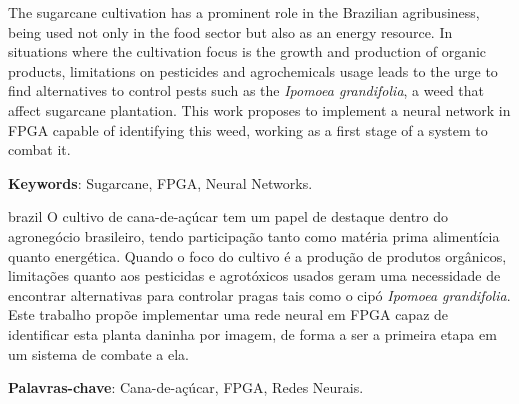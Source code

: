 \documentclass[
    12pt,                       %
    oneside,                    %
    a4paper,                    %
    brazil,                     %
    french,                     %
    spanish,                    %
    english,                    %
    ]{abntex2}
\begin{document}

\frenchspacing


\imprimircapa

\imprimirfolhaderosto



\begin{resumo}
  The sugarcane cultivation has a prominent role in the Brazilian agribusiness, being used not only in the food sector but also as an energy resource. In situations where the cultivation focus is the growth and production of organic products, limitations on pesticides and agrochemicals usage leads to the urge to find alternatives to control pests such as the \textit{Ipomoea grandifolia}, a weed that affect sugarcane plantation. This work proposes to implement a neural network in FPGA capable of identifying this weed, working as a first stage of a system to combat it.

   \vspace{\onelineskip}
   \noindent
   \textbf{Keywords}: Sugarcane, FPGA, Neural Networks.
\end{resumo}

\setlength{\absparsep}{18pt} %
\begin{resumo}[Resumo]
\begin{otherlanguage*}{brazil}
 O cultivo de cana-de-açúcar tem um papel de destaque dentro do agronegócio brasileiro, tendo participação tanto como matéria prima alimentícia quanto energética. Quando o foco do cultivo é a produção de produtos orgânicos, limitações quanto aos pesticidas e agrotóxicos usados geram uma necessidade de encontrar alternativas para controlar pragas tais como o cipó \textit{Ipomoea grandifolia}. Este trabalho propõe implementar uma rede neural em FPGA capaz de identificar esta planta daninha por imagem, de forma a ser a primeira etapa em um sistema de combate a ela.

 \textbf{Palavras-chave}: Cana-de-açúcar, FPGA, Redes Neurais.
  \end{otherlanguage*}
\end{resumo}
\end{document}
